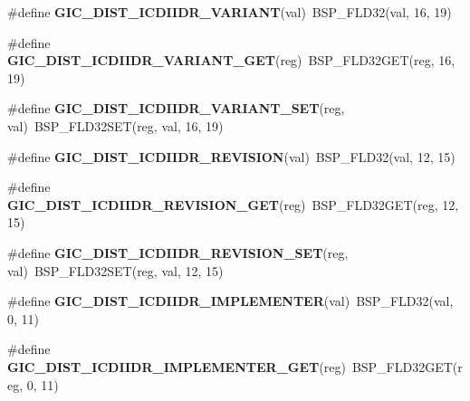 \begin{DoxyCompactItemize}
\#define {\bfseries G\+I\+C\+\_\+\+D\+I\+S\+T\+\_\+\+I\+C\+D\+I\+I\+D\+R\+\_\+\+V\+A\+R\+I\+A\+NT}(val)~B\+S\+P\+\_\+\+F\+L\+D32(val, 16, 19)
\item 
\mbox{\label{arm-gic-regs_8h_a6f40a10c9897e02c5487191017eb65e5}} 
\#define {\bfseries G\+I\+C\+\_\+\+D\+I\+S\+T\+\_\+\+I\+C\+D\+I\+I\+D\+R\+\_\+\+V\+A\+R\+I\+A\+N\+T\+\_\+\+G\+ET}(reg)~B\+S\+P\+\_\+\+F\+L\+D32\+G\+ET(reg, 16, 19)
\item 
\mbox{\label{arm-gic-regs_8h_aa1ec060f1e9ae99d9eb614225aa8b7ec}} 
\#define {\bfseries G\+I\+C\+\_\+\+D\+I\+S\+T\+\_\+\+I\+C\+D\+I\+I\+D\+R\+\_\+\+V\+A\+R\+I\+A\+N\+T\+\_\+\+S\+ET}(reg,  val)~B\+S\+P\+\_\+\+F\+L\+D32\+S\+ET(reg, val, 16, 19)
\item 
\mbox{\label{arm-gic-regs_8h_a9a98501fe66e162da5c405220a1319c2}} 
\#define {\bfseries G\+I\+C\+\_\+\+D\+I\+S\+T\+\_\+\+I\+C\+D\+I\+I\+D\+R\+\_\+\+R\+E\+V\+I\+S\+I\+ON}(val)~B\+S\+P\+\_\+\+F\+L\+D32(val, 12, 15)
\item 
\mbox{\label{arm-gic-regs_8h_a7d5711cf80f6e5cd186cadf5f8771b71}} 
\#define {\bfseries G\+I\+C\+\_\+\+D\+I\+S\+T\+\_\+\+I\+C\+D\+I\+I\+D\+R\+\_\+\+R\+E\+V\+I\+S\+I\+O\+N\+\_\+\+G\+ET}(reg)~B\+S\+P\+\_\+\+F\+L\+D32\+G\+ET(reg, 12, 15)
\item 
\mbox{\label{arm-gic-regs_8h_a185c4c50c8590c6a7034819f4745f57b}} 
\#define {\bfseries G\+I\+C\+\_\+\+D\+I\+S\+T\+\_\+\+I\+C\+D\+I\+I\+D\+R\+\_\+\+R\+E\+V\+I\+S\+I\+O\+N\+\_\+\+S\+ET}(reg,  val)~B\+S\+P\+\_\+\+F\+L\+D32\+S\+ET(reg, val, 12, 15)
\item 
\mbox{\label{arm-gic-regs_8h_a504f66508b4b17698729c7fe98a310e3}} 
\#define {\bfseries G\+I\+C\+\_\+\+D\+I\+S\+T\+\_\+\+I\+C\+D\+I\+I\+D\+R\+\_\+\+I\+M\+P\+L\+E\+M\+E\+N\+T\+ER}(val)~B\+S\+P\+\_\+\+F\+L\+D32(val, 0, 11)
\item 
\mbox{\label{arm-gic-regs_8h_aabd375d93fa3bba3e8ff5333d3df6283}} 
\#define {\bfseries G\+I\+C\+\_\+\+D\+I\+S\+T\+\_\+\+I\+C\+D\+I\+I\+D\+R\+\_\+\+I\+M\+P\+L\+E\+M\+E\+N\+T\+E\+R\+\_\+\+G\+ET}(reg)~B\+S\+P\+\_\+\+F\+L\+D32\+G\+ET(reg, 0, 11)
\item 
\mbox{\label{arm-gic-regs_8h_a3c009de0d7de20da20a0e08bb9a60b04}} 

\end{DoxyCompactItemize}
